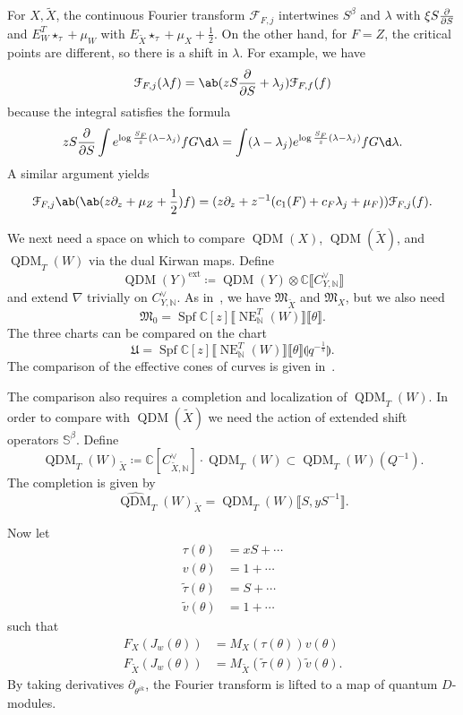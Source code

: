 \documentclass[leqno, openany]{memoir}
\theoremstyle{definition}
\theoremstyle{remark}
\theoremstyle{plain}
\theoremstyle{definition}
\theoremstyle{remark}
\newcommand{\N}{\mathbb{N}}
\newcommand{\C}{\mathbb{C}}
\newcommand{\mc}[1]{\mathcal{#1}}
\newcommand{\mf}[1]{\mathfrak{#1}}
\newcommand{\on}[1]{\operatorname{#1}}
\newcommand{\wt}[1]{\widetilde{#1}}
\newcommand{\wh}[1]{\widehat{#1}}
\DeclareMathOperator{\QDM}{QDM}
\begin{document}
For $X, \wt{X}$, the continuous Fourier transform $\mc{F}_{F,j}$ intertwines $S^{\beta}$ and $\lambda$ with $\xi S \pdv{}{S}$ and $E_W^T \star_{\tau} + \mu_W$ with $E_{\wt{X}} \star_{\tau} + \mu_X + \frac{1}{2}$. On the other hand, for $F=Z$, the critical points are different, so there is a shift in $\lambda$. For example, we have
\[ \mc{F}_{F,j}(\lambda f) = \ab(z S \pdv{}{S} + \lambda_j) \mc{F}_{F,f}(f) \]
because the integral satisfies the formula
\[ z S \pdv{}{S} \int e^{\log \frac{S_F}{z}(\lambda - \lambda_j)} f G \d \lambda = \int (\lambda - \lambda_j) e^{\log \frac{S_F}{z} (\lambda - \lambda_j)} f G \d \lambda. \]
A similar argument yields
\[ \mc{F}_{F,j} \ab( \ab(z \partial_z + \mu_Z + \frac{1}{2}) f) = (z \partial_z + z^{-1}(c_1(F) + c_F \lambda_j + \mu_F)) \mc{F}_{F,j}(f). \]

We next need a space on which to compare $\QDM(X)$, $\QDM(\wt{X})$, and $\QDM_T(W)$ via the dual Kirwan maps. Define
\[ \QDM(Y)^{\on{ext}} \coloneqq \QDM(Y) \otimes \C \llbracket C_{Y, \N}^{\vee} \rrbracket \]
and extend $\nabla$ trivially on $C_{Y,\N}^{\vee}$. As in~, we have $\mf{M}_{\wt{X}}$ and $\mf{M}_X$, but we also need
\[ \mf{M}_0 = \on{Spf} \C[z] \llbracket \on{NE}_{\N}^T(W) \rrbracket \llbracket \theta \rrbracket. \]
The three charts can be compared on the chart
\[ \mf{U} = \on{Spf} \C[z] \llbracket \on{NE}_{\N}^T(W) \rrbracket \llbracket \theta \rrbracket \llparenthesis q^{-\frac{1}{s}} \rrparenthesis. \]
The comparison of the effective cones of curves is given in~.

The comparison also requires a completion and localization of $\QDM_T(W)$. In order to compare with $\QDM(\wt{X})$ we need the action of extended shift operators $\mathbb{S}^{\beta}$. Define
\[ \QDM_T(W)_{\wt{X}} \coloneqq \C[C_{\wt{X}, \N}^{\vee}] \cdot \QDM_T(W) \subset \QDM_T(W) (Q^{-1}). \]
The completion is given by
\[ \wh{\QDM}_T(W)_{\wt{X}} = \QDM_T(W) \llbracket S, yS^{-1} \rrbracket. \]

Now let
\begin{align*}
    \tau(\theta) &= x S + \cdots \\
    v(\theta) &= 1 + \cdots \\
    \wt{\tau}(\theta) &= S + \cdots \\
    \wt{v}(\theta) &= 1 + \cdots
\end{align*}
such that
\begin{align*}
    F_X(J_w(\theta)) &= M_X(\tau(\theta)) v(\theta) \\
    F_{\wt{X}}(J_w(\theta)) &= M_{\wt{X}}(\wt{\tau}(\theta)) \wt{v}(\theta).
\end{align*}
By taking derivatives $\partial_{\theta^{ik}}$, the Fourier transform is lifted to a map of quantum $D$-modules.
\end{document}
